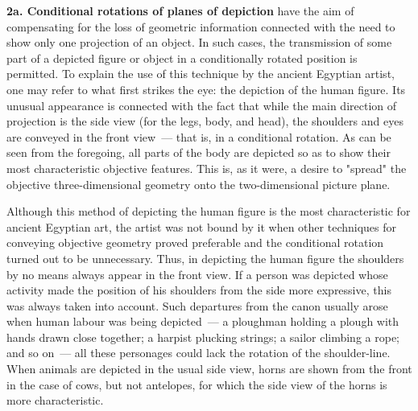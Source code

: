 \noindent\textbf{2a. Conditional rotations of planes of depiction} have the aim of
compensating for the loss of geometric information connected with the need to show
only one projection of an object. In such cases, the transmission of some part of a
depicted figure or object in a conditionally rotated position is permitted. To explain the
use of this technique by the ancient Egyptian artist, one may refer to what first strikes
the eye: the depiction of the human figure. Its unusual appearance is connected with
the fact that while the main direction of projection is the side view (for the legs, body,
and head), the shoulders and eyes are conveyed in the front view~--- that is, in a
conditional rotation. As can be seen from the foregoing, all parts of the body are
depicted so as to show their most characteristic objective features. This is, as it were, a
desire to "spread" the objective three-dimensional geometry onto the two-dimensional
picture plane.

Although this method of depicting the human figure is the most characteristic for
ancient Egyptian art, the artist was not bound by it when other techniques for
conveying objective geometry proved preferable and the conditional rotation turned out
to be unnecessary. Thus, in depicting the human figure the shoulders by no means
always appear in the front view. If a person was depicted whose activity made the
position of his shoulders from the side more expressive, this was always taken into
account. Such departures from the canon usually arose when human labour was being
depicted~--- a ploughman holding a plough with hands drawn close together; a harpist
plucking strings; a sailor climbing a rope; and so on~--- all these personages could lack
the rotation of the shoulder-line. When animals are depicted in the usual side view,
horns are shown from the front in the case of cows, but not antelopes, for which the
side view of the horns is more characteristic.



